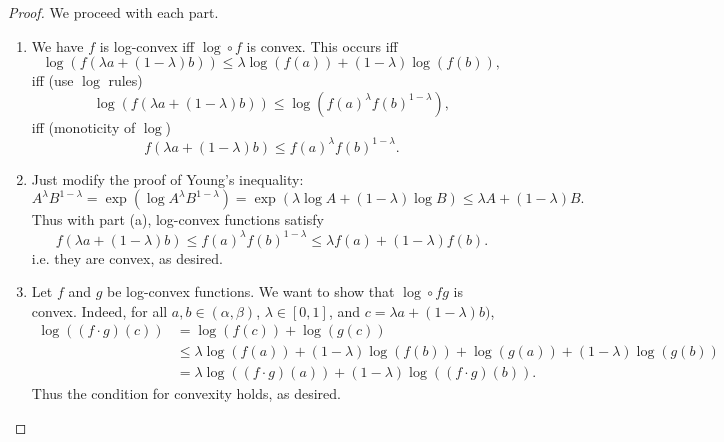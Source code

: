 \documentclass[12pt]{article}
\theoremstyle{remark}
\theoremstyle{named}
\renewcommand{\a}{\alpha}
\renewcommand{\b}{\beta}
\begin{document}
\begin{proof}
    We proceed with each part.
    \begin{enumerate}
        \item We have \(f\) is log-convex iff \(\log \circ f\) is convex. This occurs iff 
        \[\log(f(\lambda a + (1 - \lambda) b)) \leq \lambda \log(f(a)) + (1 - \lambda) \log(f(b)),\]
        iff (use \(\log\) rules)
        \[\log(f(\lambda a + (1 - \lambda) b)) \leq \log(f(a)^\lambda f(b)^{1 - \lambda}),\]
        iff (monoticity of \(\log\))
        \[f(\lambda a + (1 - \lambda) b) \leq f(a)^\lambda f(b)^{1 - \lambda}.\]
        \item Just modify the proof of Young's inequality:
        \[A^\lambda B^{1 - \lambda} = \exp(\log A^\lambda B^{1 - \lambda}) = \exp(\lambda \log A + (1 - \lambda) \log B) \leq \lambda A + (1 - \lambda) B.\]
        Thus with part (a), log-convex functions satisfy
        \[f(\lambda a + (1 - \lambda) b) \leq f(a)^\lambda f(b)^{1 - \lambda} \leq \lambda f(a) + (1 - \lambda) f(b).\]
        i.e. they are convex, as desired.
        \item Let \(f\) and \(g\) be log-convex functions. We want to show that \(\log \circ fg\) is convex. Indeed, for all \(a, b \in (\a, \b)\), \(\lambda \in [0, 1]\), and \(c = \lambda a + (1 - \lambda) b)\),
        \begin{align*}
            \log ((f \cdot g) (c)) &= \log(f(c)) + \log(g(c)) \\
            &\leq \lambda \log(f(a)) + (1 - \lambda)\log(f(b)) + \log(g(a)) + (1 - \lambda)\log(g(b)) \\
            &= \lambda \log ((f \cdot g)(a)) + (1 - \lambda) \log ((f \cdot g) (b)).
        \end{align*}
        Thus the condition for convexity holds, as desired.
    \end{enumerate}
\end{proof}
\end{document}
